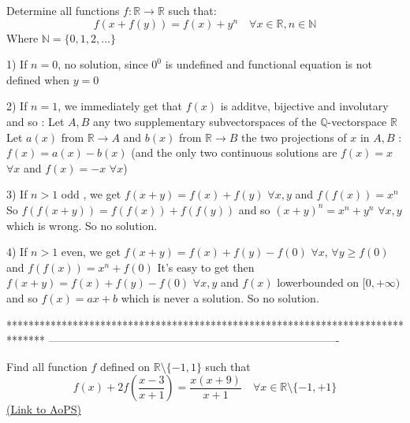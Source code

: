 \begin{solution}
	\begin{tcolorbox}Determine all  functions $f: \mathbb R\to\mathbb R$ such that:
\[f(x+f(y))=f(x)+y^{n} \quad \forall x\in\mathbb R , n\in\mathbb N\] 
Where $\mathbb N=\{0,1,2,...\}$\end{tcolorbox}
1) If $n=0$, no solution, since $0^0$ is undefined and functional equation is not defined when $y=0$

2) If $n=1$, we immediately get that $f(x)$ is additve, bijective and involutary and so :
Let $A,B$ any two supplementary subvectorspaces of the $\mathbb Q$-vectorspace $\mathbb R$
Let $a(x)$ from $\mathbb R\to A$ and $b(x)$ from $\mathbb R\to B$ the two projections of $x$ in $A,B$ :
$f(x)=a(x)-b(x)$ (and the only two continuous solutions are $f(x)=x$ $\forall x$ and $f(x)=-x$ $\forall x$)

3) If $n>1$ odd , we get $f(x+y)=f(x)+f(y)$ $\forall x,y$ and $f(f(x))=x^n$ 
So $f(f(x+y))=f(f(x))+f(f(y))$ and so $(x+y)^n=x^n+y^n$ $\forall x,y$ which is wrong.
So no solution.

4) If $n>1$ even, we get  $f(x+y)=f(x)+f(y)-f(0)$ $\forall x$, $\forall y\ge f(0)$ and $f(f(x))=x^n+f(0)$
It's easy to get then $f(x+y)=f(x)+f(y)-f(0)$ $\forall x,y$ and $f(x)$ lowerbounded on $[0,+\infty)$ and so $f(x)=ax+b$ which is never a solution.
So no solution.
\end{solution}
*******************************************************************************
-------------------------------------------------------------------------------

\begin{problem}
	Find all function $f$ defined on $\mathbb{R}\setminus  \{-1, 1\}$ such that
\[f (x) + 2 f \left (\frac{x-3}{x +1}\right ) = \frac{x (x +9) }{ x +1} \quad \forall x \in \mathbb R \setminus  \{-1, +1\}\]
	\flushright \href{https://artofproblemsolving.com/community/c6h566569}{(Link to AoPS)}
\end{problem}



